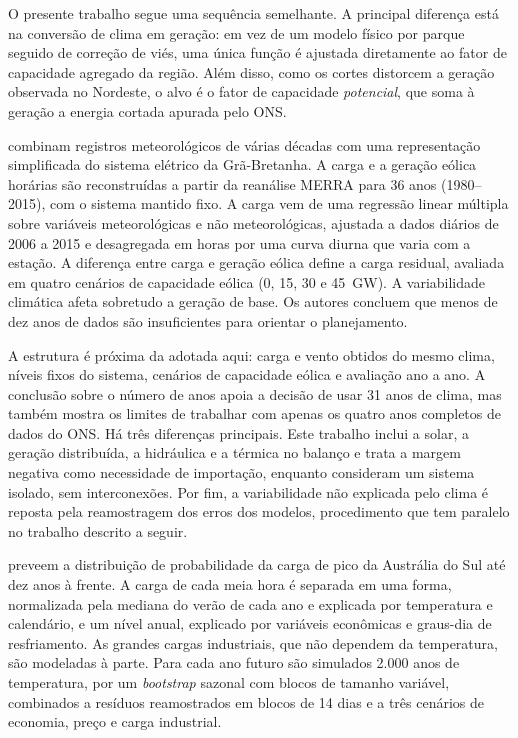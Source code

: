 O presente trabalho segue uma sequência semelhante. A principal diferença está na conversão de clima em geração: em vez de um modelo físico por parque seguido de correção de viés, uma única função é ajustada diretamente ao fator de capacidade agregado da região. Além disso, como os cortes distorcem a geração observada no Nordeste, o alvo é o fator de capacidade \emph{potencial}, que soma à geração a energia cortada apurada pelo ONS.

\textcite{bloomfield2016} combinam registros meteorológicos de várias décadas com uma representação simplificada do sistema elétrico da Grã-Bretanha. A carga e a geração eólica horárias são reconstruídas a partir da reanálise MERRA para 36 anos (1980--2015), com o sistema mantido fixo. A carga vem de uma regressão linear múltipla sobre variáveis meteorológicas e não meteorológicas, ajustada a dados diários de 2006 a 2015 e desagregada em horas por uma curva diurna que varia com a estação. A diferença entre carga e geração eólica define a carga residual, avaliada em quatro cenários de capacidade eólica (0, 15, 30 e 45~GW). A variabilidade climática afeta sobretudo a geração de base. Os autores concluem que menos de dez anos de dados são insuficientes para orientar o planejamento.

A estrutura é próxima da adotada aqui: carga e vento obtidos do mesmo clima, níveis fixos do sistema, cenários de capacidade eólica e avaliação ano a ano. A conclusão sobre o número de anos apoia a decisão de usar 31 anos de clima, mas também mostra os limites de trabalhar com apenas os quatro anos completos de dados do ONS. Há três diferenças principais. Este trabalho inclui a solar, a geração distribuída, a hidráulica e a térmica no balanço e trata a margem negativa como necessidade de importação, enquanto \textcite{bloomfield2016} consideram um sistema isolado, sem interconexões. Por fim, a variabilidade não explicada pelo clima é reposta pela reamostragem dos erros dos modelos, procedimento que tem paralelo no trabalho descrito a seguir.

\textcite{hyndman2010} preveem a distribuição de probabilidade da carga de pico da Austrália do Sul até dez anos à frente. A carga de cada meia hora é separada em uma forma, normalizada pela mediana do verão de cada ano e explicada por temperatura e calendário, e um nível anual, explicado por variáveis econômicas e graus-dia de resfriamento. As grandes cargas industriais, que não dependem da temperatura, são modeladas à parte. Para cada ano futuro são simulados 2.000 anos de temperatura, por um \textit{bootstrap} sazonal com blocos de tamanho variável, combinados a resíduos reamostrados em blocos de 14 dias e a três cenários de economia, preço e carga industrial.

